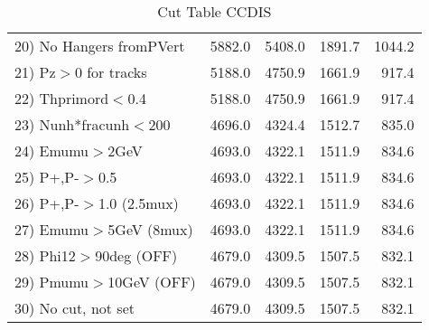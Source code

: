 \begin{table}[h!]
\begin{tabular}{||l||r|r|r|r||}
 20) No Hangers fromPVert &      5882.0 &      5408.0 &      1891.7 &      1044.2 \\
 21) Pz$>$0 for tracks    &      5188.0 &      4750.9 &      1661.9 &       917.4 \\
 22) Thprimord$<$0.4      &      5188.0 &      4750.9 &      1661.9 &       917.4 \\
 23) Nunh*fracunh$<$200   &      4696.0 &      4324.4 &      1512.7 &       835.0 \\
 24) Emumu$>$2GeV         &      4693.0 &      4322.1 &      1511.9 &       834.6 \\
 25) P+,P-$>$0.5          &      4693.0 &      4322.1 &      1511.9 &       834.6 \\
 26) P+,P-$>$1.0 (2.5mux) &      4693.0 &      4322.1 &      1511.9 &       834.6 \\
 27) Emumu$>$5GeV  (8mux) &      4693.0 &      4322.1 &      1511.9 &       834.6 \\
 28) Phi12$>$90deg  (OFF) &      4679.0 &      4309.5 &      1507.5 &       832.1 \\
 29) Pmumu$>$10GeV  (OFF) &      4679.0 &      4309.5 &      1507.5 &       832.1 \\
 30) No cut, not set      &      4679.0 &      4309.5 &      1507.5 &       832.1 \\
 \hline
 \hline
 \end{tabular}
 \caption{Cut Table  CCDIS  }
 \label{tab-cut_ccdis}
 \end{table}

